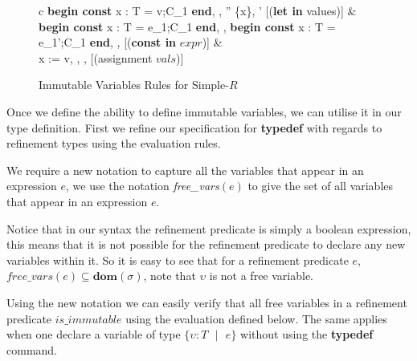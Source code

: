 \documentclass[a4paper,12pt]{report}
\begin{document}
\begin{figure}[H]
  \begin{center}
    \begin{tabular}{c}
      {\langle \textbf{begin const }x : T = v;C_1\textbf{ end}, \sigma, \tau \rangle 
      \longrightarrow \langle \sigma'' \setminus \{x\}, \tau' \rangle} [(\textbf{let in} values)] 
      & \\
      \footnotesize
      {\langle \textbf{begin const }x : T = e_1;C_1\textbf{ end}, \sigma,\tau \rangle 
      \longrightarrow \langle \textbf{begin const }x : T = e_1';C_1\textbf{ end}, \sigma, \tau \rangle}
      [(\textbf{const in} $expr$)]
      \normalsize
      & \\
      {\langle x := v, \sigma, \tau \rangle \longrightarrow \langle \sigma[x \mapsto v], \tau \rangle} [(assignment $vals$)]
    \end{tabular}
  \end{center}
  \caption{Immutable Variables Rules for Simple-$R$}
\end{figure}

\par
Once we define the ability to define immutable variables, we can utilise it in 
our type definition. First we refine our specification for \textbf{typedef} 
with regards to refinement types using the evaluation rules.

\par
We require a new notation to capture all the variables that appear in an 
expression $e$, we use the notation \textit{free\_vars}$(e)$ to give the set of all 
variables that appear in an expression $e$.

\par
Notice that in our syntax the refinement predicate is simply a boolean 
expression, this means that it is not possible for the refinement predicate to 
declare any new variables within it. So it is easy to see that for a refinement 
predicate $e$, $\textit{free\_vars}(e) \subseteq \textbf{dom}(\sigma)$, note that 
$\upsilon$ is not a free variable. 

\par
Using the new notation we can easily verify that all free variables in a 
refinement predicate $is\_immutable$ using the evaluation defined below. The same 
applies when one declare a variable of type $\{\upsilon : T\text{ }|\text{ }e\}$ 
without using the \textbf{typedef} command.
\end{document}
